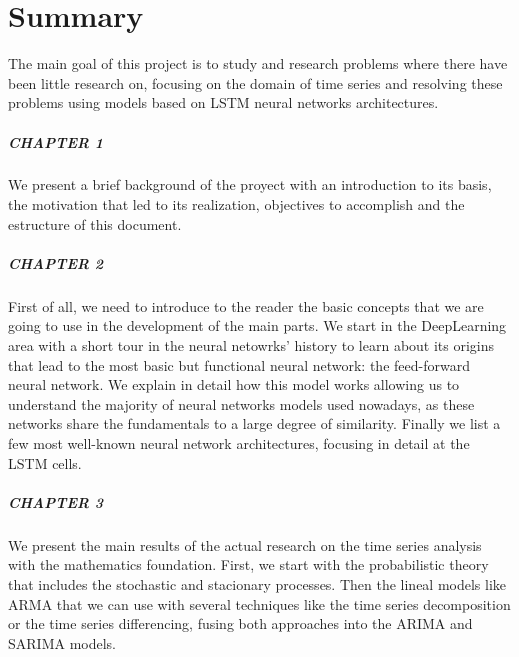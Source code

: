 %

\chapter*{Summary}\label{ch:summary}

The main goal of this project is to study and research problems where there have been little research on, focusing on the domain of time series and resolving these problems using models based on LSTM neural networks architectures.

\paragraph{CHAPTER 1} We present a brief background of the proyect with an introduction to its basis, the motivation that led to its realization, objectives to accomplish and the estructure of this document.

\paragraph{CHAPTER 2} First of all, we need to introduce to the reader the basic concepts that we are going to use in the development of the main parts. We start in the DeepLearning area with a short tour in the neural netowrks' history to learn about its origins that lead to the most basic but functional neural network: the feed-forward neural network. We explain in detail how this model works allowing us to understand the majority of neural networks models used nowadays, as these networks share the fundamentals to a large degree of similarity. Finally we list a few most well-known neural network architectures, focusing in detail at the LSTM cells.

\paragraph{CHAPTER 3} We present the main results of the actual research on the time series analysis with the mathematics foundation. First, we start with the probabilistic theory that includes the stochastic and stacionary processes. Then the lineal models like ARMA that we can use with several techniques like the time series decomposition or the time series differencing, fusing both approaches into the ARIMA and SARIMA models.


